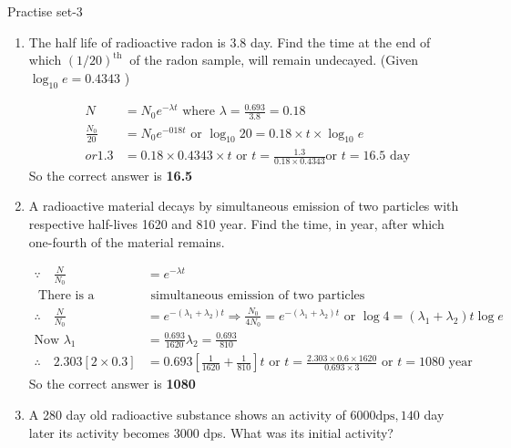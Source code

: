 \newpage
\begin{abox}
	Practise set-3
	\end{abox}
\begin{enumerate}
	\item  The half life of radioactive radon is $3.8$ day. Find the time at the end of which $(1 / 20)^{\text {th }}$ of the radon sample, will remain undecayed. (Given $\log _{10} e=0.4343$ )
	\begin{answer}
		\begin{align*}
		N&=N_0e^{-\lambda t}\text { where } \lambda=\frac{0.693}{3.8}=0.18\\
		\frac{N_0}{20}&=N_0 e^{-018 t}\text{ or }\log _{10} 20=0.18 \times t \times \log _{10} e\\
		or 1.3&=0.18 \times 0.4343 \times t\text{ or }t=\frac{1.3}{0.18 \times 0.4343} \text{or }t=16.5\text{ day}
		\end{align*}
		So the correct answer is \textbf{16.5}
	\end{answer}
		\item  A radioactive material decays by simultaneous emission of two particles with respective half-lives 1620 and 810 year. Find the time, in year, after which one-fourth of the material remains.
	\begin{answer}
		\begin{align*}
		\because \quad\frac{N}{N_0}&=e^{-\lambda t}\\
	\text{	There is a}&\text{ simultaneous emission of two particles}\\
		\therefore \quad\frac{N}{N_0}&=e^{-\left(\lambda_1+\lambda_2\right) t} \Rightarrow \frac{N_0}{4 N_0}=e^{-\left(\lambda_1+\lambda_2\right) t} \text { or } \log 4=\left(\lambda_1+\lambda_2\right) t \log e\\
		\text{Now }\lambda_1&=\frac{0.693}{1620} \lambda_2=\frac{0.693}{810}\\
		\therefore \quad2.303[2 \times 0.3]&=0.693\left[\frac{1}{1620}+\frac{1}{810}\right] t \text { or } t=\frac{2.303 \times 0.6 \times 1620}{0.693 \times 3} \text { or } t=1080 \text { year }
		\end{align*}
			So the correct answer is \textbf{1080}
	\end{answer}
		\item  A 280 day old radioactive substance shows an activity of $6000 \mathrm{dps}, 140$ day later its activity becomes 3000 dps. What was its initial activity?
	\begin{answer}
		\begin{align*}

\end{align*}
\end{answer}
\end{enumerate}
